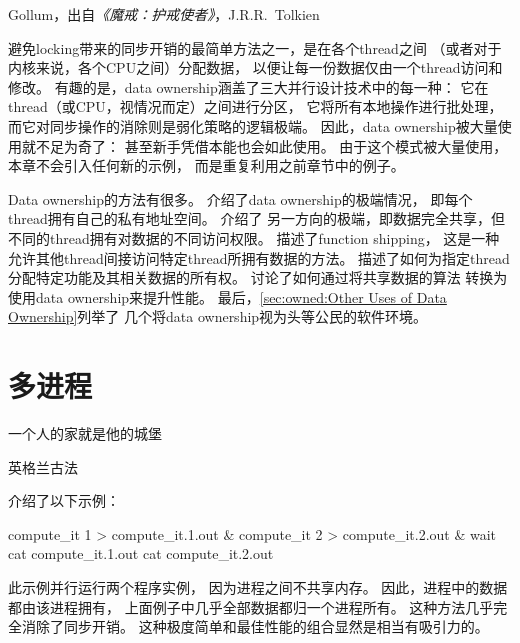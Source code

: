 
%
	 {Gollum，出自\emph{《魔戒：护戒使者》}，J.R.R.~Tolkien}

避免locking带来的同步开销的最简单方法之一，是在各个thread之间
（或者对于内核来说，各个CPU之间）分配数据，
以便让每一份数据仅由一个thread访问和修改。
有趣的是，data ownership涵盖了三大并行设计技术中的每一种：
它在thread（或CPU，视情况而定）之间进行分区，
它将所有本地操作进行批处理，
而它对同步操作的消除则是弱化策略的逻辑极端。
因此，data ownership被大量使用就不足为奇了：
甚至新手凭借本能也会如此使用。
由于这个模式被大量使用，本章不会引入任何新的示例，
而是重复利用之前章节中的例子。

\QuickQuizEnd

Data ownership的方法有很多。
介绍了data ownership的极端情况，
即每个thread拥有自己的私有地址空间。
介绍了
另一方向的极端，即数据完全共享，但不同的thread拥有对数据的不同访问权限。
描述了function shipping，
这是一种允许其他thread间接访问特定thread所拥有数据的方法。
描述了如何为指定thread
分配特定功能及其相关数据的所有权。
讨论了如何通过将共享数据的算法
转换为使用data ownership来提升性能。
最后，\cref{sec:owned:Other Uses of Data Ownership}列举了
几个将data ownership视为头等公民的软件环境。

\section{多进程}
\label{sec:owned:Multiple Processes}
%
\epigraph{一个人的家就是他的城堡}{英格兰古法}

介绍了以下示例：

\begin{VerbatimN}[samepage=true]
compute_it 1 > compute_it.1.out &
compute_it 2 > compute_it.2.out &
wait
cat compute_it.1.out
cat compute_it.2.out
\end{VerbatimN}

此示例并行运行两个程序实例，
因为进程之间不共享内存。
因此，进程中的数据都由该进程拥有，
上面例子中几乎全部数据都归一个进程所有。
这种方法几乎完全消除了同步开销。
这种极度简单和最佳性能的组合显然是相当有吸引力的。

